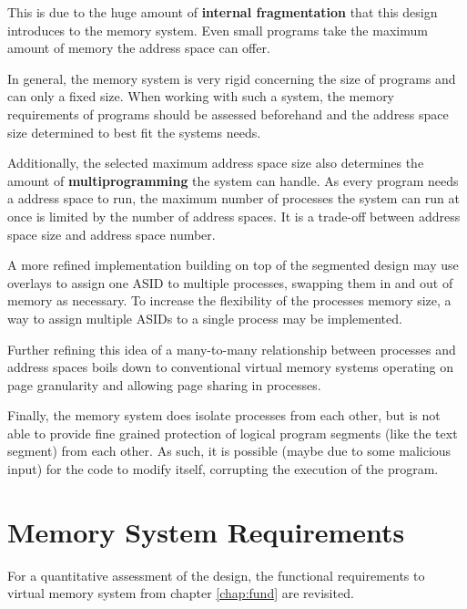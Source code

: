 This is due to the huge amount of \textbf{internal fragmentation} that this design introduces to the memory system. Even small programs take the maximum amount of memory the address space can offer.

In general, the memory system is very rigid concerning the size of programs and can only a fixed size. When working with such a system, the memory requirements of programs should be assessed beforehand and the address space size determined to best fit the systems needs.

Additionally, the selected maximum address space size also determines the amount of \textbf{multiprogramming} the system can handle. As every program needs a address space to run, the maximum number of processes the system can run at once is limited by the number of address spaces.
It is a trade-off between address space size and address space number.

A more refined implementation building on top of the segmented design may use overlays \cite{tanenbaumOS} to assign one ASID to multiple processes, swapping them in and out of memory as necessary. To increase the flexibility of the processes memory size, a way to assign multiple ASIDs to a single process may be implemented.

Further refining this idea of a many-to-many relationship between processes and address spaces boils down to conventional virtual memory systems operating on page granularity and allowing page sharing in processes.

Finally, the memory system does isolate processes from each other, but is not able to provide fine grained protection of logical program segments (like the text segment) from each other. As such, it is possible (maybe due to some malicious input) for the code to modify itself, corrupting the execution of the program.

\section{Memory System Requirements}
For a quantitative assessment of the design, the functional requirements to virtual memory system from chapter \ref{chap:fund} are revisited.


